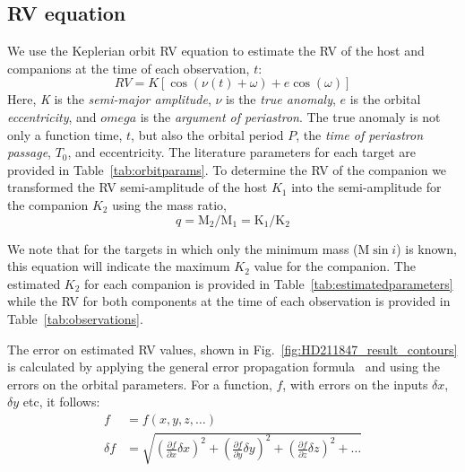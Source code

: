 \documentclass[fleqn,usenatbib]{mnras}
\begin{document}
    \subsection{RV equation}
    We use the Keplerian orbit RV equation to estimate the RV of the host and companions at the time of each observation, \(t\): 
    \begin{equation}
    RV = K [\cos{(\nu(t) + \omega)} + e\cos{(\omega)}]
    \end{equation}
    Here, \emph{K} is the \emph{semi-major amplitude}, \(\nu\) is the \emph{true anomaly}, \(e\) is the orbital \emph{eccentricity}, and \(omega\) is the \emph{argument of periastron}. The true anomaly is not only a function time, \(t\), but also the orbital period \(P\),  the \emph{time of periastron passage}, \(T_0\), and eccentricity. The literature parameters for each target are provided in Table~\ref{tab:orbitparams}.
    To determine the RV of the companion we transformed the RV semi-amplitude of the host \(K_{1} \) into the semi-amplitude for the companion \(K_{2} \) using the mass ratio,
    \begin{equation}
    \label{eqn:mass_ratio}
    q = \textrm{M}_{2} / \textrm{M}_{1} = \textrm{K}_{1} / \textrm{K}_{2}
    \end{equation}
    
    We note that for the targets in which only the minimum mass (\(\textrm{M}\sin{i} \)) is known, this equation will indicate the maximum \(K_2\) value for the companion. The estimated \(K_2\) for each companion is provided in Table~\ref{tab:estimatedparameters} while the RV for both components at the time of each observation is provided in Table~\ref{tab:observations}.
    
    The error on estimated RV values, shown in Fig.~\ref{fig:HD211847_result_contours} is calculated by applying the general error propagation formula~\citep{ku_notes_1966} and using the  errors on the orbital parameters. For a function, \(f\), with errors on the inputs \(\delta x\), \(\delta y\) etc, it follows: 
    \begin{align}
    f &= f(x, y, z, \ldots)\\
    \delta f &= \sqrt{{\left( \frac{\partial f}{\partial x} \delta x\right)}^2 + {\left(\frac{\partial f}{\partial y} \delta y\right)}^2 + {\left(\frac{\partial f}{\partial z} \delta z\right)}^2 + \ldots}
    \end{align}  
    
    
    
\end{document}
